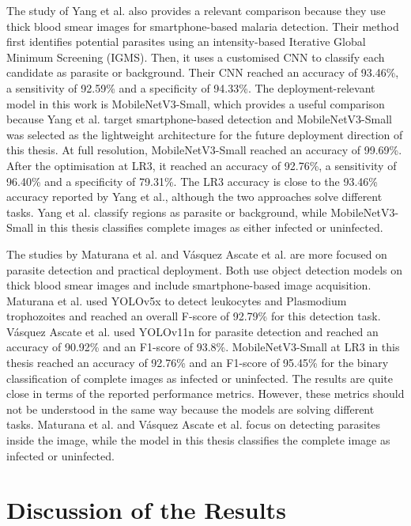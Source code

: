 The study of Yang et al. \cite{Yang2020} also provides a relevant comparison because they use thick blood smear images for smartphone-based malaria detection. Their method first identifies potential parasites using an intensity-based Iterative Global Minimum Screening (IGMS). Then, it uses a customised CNN to classify each candidate as parasite or background. Their CNN reached an accuracy of 93.46\%, a sensitivity of 92.59\% and a specificity of 94.33\%. The deployment-relevant model in this work is MobileNetV3-Small, which provides a useful comparison because Yang et al. target smartphone-based detection and MobileNetV3-Small was selected as the lightweight architecture for the future deployment direction of this thesis. At full resolution, MobileNetV3-Small reached an accuracy of 99.69\%. After the optimisation at LR3, it reached an accuracy of 92.76\%, a sensitivity of 96.40\% and a specificity of 79.31\%. The LR3 accuracy is close to the 93.46\% accuracy reported by Yang et al., although the two approaches solve different tasks. Yang et al. classify regions as parasite or background, while MobileNetV3-Small in this thesis classifies complete images as either infected or uninfected.

The studies by Maturana et al. \cite{Maturana2023} and Vásquez Ascate et al. \cite{VasquezAscate2026} are more focused on parasite detection and practical deployment. Both use object detection models on thick blood smear images and include smartphone-based image acquisition. Maturana et al. used YOLOv5x to detect leukocytes and Plasmodium trophozoites and reached an overall F-score of 92.79\% for this detection task. Vásquez Ascate et al. used YOLOv11n for parasite detection and reached an accuracy of 90.92\% and an F1-score of 93.8\%. MobileNetV3-Small at LR3 in this thesis reached an accuracy of 92.76\% and an F1-score of 95.45\% for the binary classification of complete images as infected or uninfected. The results are quite close in terms of the reported performance metrics. However, these metrics should not be understood in the same way because the models are solving different tasks. Maturana et al. and Vásquez Ascate et al. focus on detecting parasites inside the image, while the model in this thesis classifies the complete image as infected or uninfected.

\section{Discussion of the Results}

